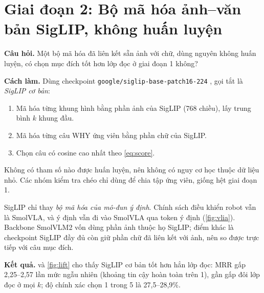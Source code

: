 \documentclass[a4paper,oneside]{report}
\begin{document}
\section{Giai đoạn 2: Bộ mã hóa ảnh--văn bản SigLIP, không huấn luyện}
\label{sec:stage2}

\textbf{Câu hỏi.} Một bộ mã hóa đã liên kết sẵn ảnh với chữ, dùng nguyên không huấn luyện, có chọn mục đích tốt hơn lớp đọc ở giai đoạn 1 không?

\textbf{Cách làm.} Dùng checkpoint \texttt{google/siglip-base-patch16-224} \citep{zhai2023siglip}, gọi tắt là \textit{SigLIP cơ bản}:
\begin{enumerate}
  \item Mã hóa từng khung hình bằng phần ảnh của SigLIP (768 chiều), lấy trung bình $k$ khung đầu.
  \item Mã hóa từng câu WHY ứng viên bằng phần chữ của SigLIP.
  \item Chọn câu có cosine cao nhất theo \cref{eq:score}.
\end{enumerate}
Không có tham số nào được huấn luyện, nên không có nguy cơ học thuộc dữ liệu nhỏ. Các nhóm kiểm tra chéo chỉ dùng để chia tập ứng viên, giống hệt giai đoạn 1.

\begin{giaithich}
SigLIP chỉ thay \textit{bộ mã hóa của mô-đun ý định}. Chính sách điều khiển robot vẫn là SmolVLA, và ý định vẫn đi vào SmolVLA qua token ý định (\cref{fig:vlia}). Backbone SmolVLM2 vốn dùng phần ảnh thuộc họ SigLIP; điểm khác là checkpoint SigLIP đầy đủ còn giữ phần chữ đã liên kết với ảnh, nên so được trực tiếp với câu mục đích.
\end{giaithich}

\textbf{Kết quả.}  và \cref{fig:lift} cho thấy SigLIP cơ bản tốt hơn hẳn lớp đọc: MRR gấp 2,25--2,57 lần mức ngẫu nhiên (khoảng tin cậy hoàn toàn trên 1), gần gấp đôi lớp đọc ở mọi $k$; độ chính xác chọn 1 trong 5 là 27,5--28,9\%.

\begin{table}[ht]
\centering
\caption{Giai đoạn 2: SigLIP cơ bản, không huấn luyện, cùng kiểm tra chéo và cùng tập ứng viên như giai đoạn 1.}
\label{tab:siglip}
\small
{}
\end{table}
\end{document}
